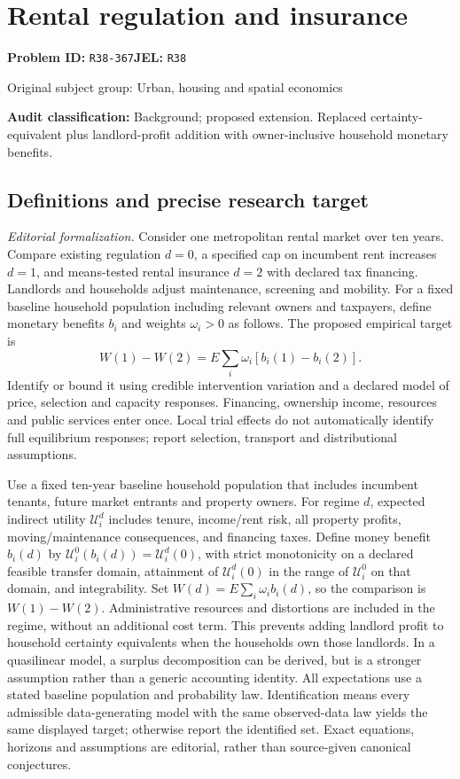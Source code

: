 \documentclass[11pt,a4paper]{article}
\begin{document}
\section*{Rental regulation and insurance}
\textbf{Problem ID:} \texttt{R38-367}\quad \textbf{JEL:} \texttt{R38}\par
\label{problem:OP-0463}
{\sffamily\small\color{muted}Original subject group: Urban, housing and spatial economics\par}
\label{definitions:problem:30007745}
\textbf{Audit classification:} Background; proposed extension. Replaced certainty-equivalent plus landlord-profit addition with owner-inclusive household monetary benefits.
\subsection*{Definitions and precise research target}
\textit{Editorial formalization.} Consider one metropolitan rental market over ten years. Compare existing regulation \(d=0\), a specified cap on incumbent rent increases \(d=1\), and means-tested rental insurance \(d=2\) with declared tax financing. Landlords and households adjust maintenance, screening and mobility. For a fixed baseline household population including relevant owners and taxpayers, define monetary benefits \(b_i\) and weights \(\omega_i>0\) as follows. The proposed empirical target is \[W(1)-W(2)=E\sum_i\omega_i[b_i(1)-b_i(2)].\] Identify or bound it using credible intervention variation and a declared model of price, selection and capacity responses. Financing, ownership income, resources and public services enter once. Local trial effects do not automatically identify full equilibrium responses; report selection, transport and distributional assumptions.

Use a fixed ten-year baseline household population that includes incumbent tenants, future market entrants and property owners. For regime \(d\), expected indirect utility \(\mathcal U_i^d\) includes tenure, income/rent risk, all property profits, moving/maintenance consequences, and financing taxes. Define money benefit \(b_i(d)\) by \(\mathcal U_i^0(b_i(d))=\mathcal U_i^d(0)\), with strict monotonicity on a declared feasible transfer domain, attainment of \(\mathcal U_i^d(0)\) in the range of \(\mathcal U_i^0\) on that domain, and integrability. Set \(W(d)=E\sum_i\omega_i b_i(d)\), so the comparison is \(W(1)-W(2)\). Administrative resources and distortions are included in the regime, without an additional cost term. This prevents adding landlord profit to household certainty equivalents when the households own those landlords. In a quasilinear model, a surplus decomposition can be derived, but is a stronger assumption rather than a generic accounting identity. All expectations use a stated baseline population and probability law. Identification means every admissible data-generating model with the same observed-data law yields the same displayed target; otherwise report the identified set. Exact equations, horizons and assumptions are editorial, rather than source-given canonical conjectures.
\end{document}
